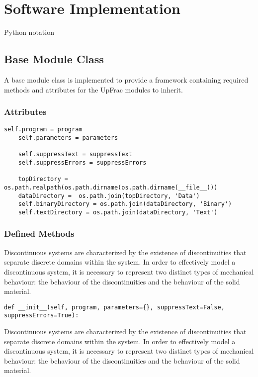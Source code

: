 \chapter{Software Implementation}

Python notation

\section{Base Module Class}

A base module class is implemented to provide a framework containing required methods and attributes for the UpFrac modules to inherit.

\subsection{Attributes}

\begin{lstlisting}[frame=single]   
    self.program = program
    self.parameters = parameters
    
    self.suppressText = suppressText
    self.suppressErrors = suppressErrors
    
    topDirectory = os.path.realpath(os.path.dirname(os.path.dirname(__file__)))
    dataDirectory =  os.path.join(topDirectory, 'Data')
    self.binaryDirectory = os.path.join(dataDirectory, 'Binary')
    self.textDirectory = os.path.join(dataDirectory, 'Text')
\end{lstlisting}


\subsection{Defined Methods}
Discontinuous systems are characterized by the existence of discontinuities that separate discrete domains within the system. In order to effectively model a discontinuous system, it is necessary to represent two distinct types of mechanical behaviour: the behaviour of the discontinuities and the behaviour of the solid material.

\begin{lstlisting}[frame=single]
def __init__(self, program, parameters={}, suppressText=False, suppressErrors=True):
\end{lstlisting}

Discontinuous systems are characterized by the existence of discontinuities that separate discrete domains within the system. In order to effectively model a discontinuous system, it is necessary to represent two distinct types of mechanical behaviour: the behaviour of the discontinuities and the behaviour of the solid material.

